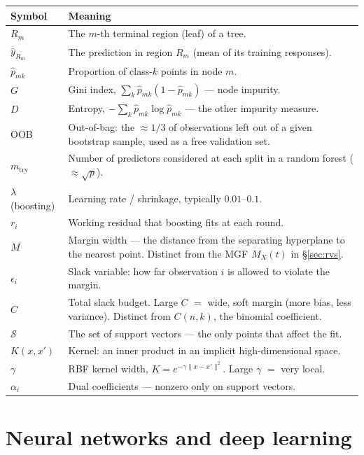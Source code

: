 \documentclass[10pt,letterpaper,onecolumn]{article}
\makeatletter
\newenvironment{symtab}
  {\begin{longtable}{@{}>{\raggedright\arraybackslash}p{0.26\textwidth}%
                       >{\raggedright\arraybackslash}p{0.70\textwidth}@{}}
   \toprule
   \textbf{Symbol} & \textbf{Meaning} \\
   \midrule
   \endhead
   \bottomrule
   \endfoot}
  {\end{longtable}}
\makeatother
\begin{document}
\begin{symtab}
$R_m$ & The $m$-th terminal region (leaf) of a tree. \\
$\hat y_{R_m}$ & The prediction in region $R_m$ (mean of its training responses). \\
$\hat p_{mk}$ & Proportion of class-$k$ points in node $m$. \\
$G$ & Gini index, $\sum_k \hat p_{mk}(1-\hat p_{mk})$ — node impurity. \\
$D$ & Entropy, $-\sum_k \hat p_{mk}\log \hat p_{mk}$ — the other impurity measure. \\
OOB & Out-of-bag: the $\approx\!1/3$ of observations left out of a given bootstrap sample, used as a free validation set. \\
$m_{\text{try}}$ & Number of predictors considered at each split in a random forest ($\approx\sqrt{p}$). \\
$\lambda$ (boosting) & Learning rate / shrinkage, typically $0.01$--$0.1$. \\
$r_i$ & Working residual that boosting fits at each round. \\
$M$ & Margin width — the distance from the separating hyperplane to the nearest point. Distinct from the MGF $M_X(t)$ in \S\ref{sec:rvs}. \\
$\epsilon_i$ & Slack variable: how far observation $i$ is allowed to violate the margin. \\
$C$ & Total slack budget. Large $C$ $=$ wide, soft margin (more bias, less variance). Distinct from $C(n,k)$, the binomial coefficient. \\
$\mathcal{S}$ & The set of support vectors — the only points that affect the fit. \\
$K(x,x')$ & Kernel: an inner product in an implicit high-dimensional space. \\
$\gamma$ & RBF kernel width, $K = e^{-\gamma\|x-x'\|^2}$. Large $\gamma$ $=$ very local. \\
$\alpha_i$ & Dual coefficients — nonzero only on support vectors. \\
\end{symtab}

\section{Neural networks and deep learning}
\end{document}

